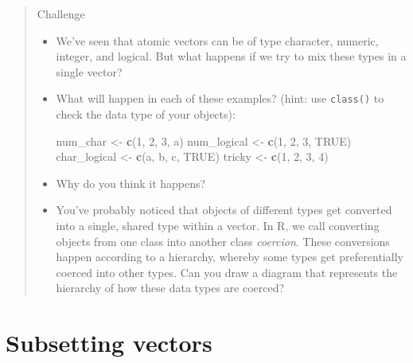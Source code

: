 \documentclass[
]{book}
\newenvironment{Shaded}{\begin{snugshade}}{\end{snugshade}}
\newcommand{\ConstantTok}[1]{\textcolor[rgb]{0.56,0.35,0.01}{#1}}
\newcommand{\DecValTok}[1]{\textcolor[rgb]{0.00,0.00,0.81}{#1}}
\newcommand{\FunctionTok}[1]{\textcolor[rgb]{0.13,0.29,0.53}{\textbf{#1}}}
\newcommand{\NormalTok}[1]{#1}
\newcommand{\OtherTok}[1]{\textcolor[rgb]{0.56,0.35,0.01}{#1}}
\newcommand{\StringTok}[1]{\textcolor[rgb]{0.31,0.60,0.02}{#1}}
\providecommand{\tightlist}{%
  \setlength{\itemsep}{0pt}\setlength{\parskip}{0pt}}
\begin{document}
\begin{quote}
Challenge

\begin{itemize}
\tightlist
\item
  We've seen that atomic vectors can be of type character,
  numeric, integer, and logical. But what happens if we try to mix these types in
  a single vector?
\end{itemize}

\begin{itemize}
\item
  What will happen in each of these examples? (hint: use \texttt{class()}
  to check the data type of your objects):

\begin{Shaded}
\begin{Highlighting}[]
\NormalTok{num\_char }\OtherTok{\textless{}{-}} \FunctionTok{c}\NormalTok{(}\DecValTok{1}\NormalTok{, }\DecValTok{2}\NormalTok{, }\DecValTok{3}\NormalTok{, }\StringTok{\textquotesingle{}a\textquotesingle{}}\NormalTok{)}
\NormalTok{num\_logical }\OtherTok{\textless{}{-}} \FunctionTok{c}\NormalTok{(}\DecValTok{1}\NormalTok{, }\DecValTok{2}\NormalTok{, }\DecValTok{3}\NormalTok{, }\ConstantTok{TRUE}\NormalTok{)}
\NormalTok{char\_logical }\OtherTok{\textless{}{-}} \FunctionTok{c}\NormalTok{(}\StringTok{\textquotesingle{}a\textquotesingle{}}\NormalTok{, }\StringTok{\textquotesingle{}b\textquotesingle{}}\NormalTok{, }\StringTok{\textquotesingle{}c\textquotesingle{}}\NormalTok{, }\ConstantTok{TRUE}\NormalTok{)}
\NormalTok{tricky }\OtherTok{\textless{}{-}} \FunctionTok{c}\NormalTok{(}\DecValTok{1}\NormalTok{, }\DecValTok{2}\NormalTok{, }\DecValTok{3}\NormalTok{, }\StringTok{\textquotesingle{}4\textquotesingle{}}\NormalTok{)}
\end{Highlighting}
\end{Shaded}
\item
  Why do you think it happens?
\item
  You've probably noticed that objects of different types get
  converted into a single, shared type within a vector. In R, we
  call converting objects from one class into another class
  \emph{coercion}. These conversions happen according to a hierarchy,
  whereby some types get preferentially coerced into other
  types. Can you draw a diagram that represents the hierarchy of how
  these data types are coerced?
\end{itemize}
\end{quote}

\section{Subsetting vectors}\label{subsetting-vectors}
\end{document}
